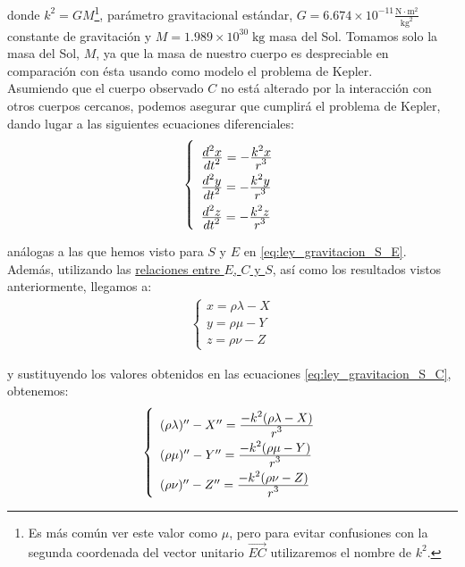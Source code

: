 \noindent donde $k^2=GM$\footnote{Es más común ver este valor como $\mu$, pero para evitar confusiones con la segunda coordenada del vector unitario $\overrightarrow{EC}$ utilizaremos el nombre de $k^2$.}, parámetro gravitacional estándar, $G=6.674\times10^{-11}\frac{\text{N}\cdot\text{m}^2}{\text{kg}^2}$ constante de gravitación y $M=1.989\times10^{30}\;\text{kg}$ masa del Sol. Tomamos solo la masa del Sol, $M$, ya que la masa de nuestro cuerpo es despreciable en comparación con ésta usando como modelo el problema de Kepler. \cite{mecanica_celeste}\\


\label{sec:ley_gravitacion}
Asumiendo que el cuerpo observado $C$ no está alterado por la interacción con otros cuerpos cercanos, podemos asegurar que cumplirá el problema de Kepler, dando lugar a las siguientes ecuaciones diferenciales:
\begin{align}
\left\{
\def\arraystretch{2}
\begin{array}{l}
	\ddfrac{d^2x}{dt^2}=-\ddfrac{k^2x}{r^3}\\
	\ddfrac{d^2y}{dt^2}=-\ddfrac{k^2y}{r^3}\\
	\ddfrac{d^2z}{dt^2}=-\ddfrac{k^2z}{r^3}
\end{array}
\right.
\label{eq:ley_gravitacion_S_C}
\end{align}

\noindent análogas a las que hemos visto para $S$ y $E$ en \eqref{eq:ley_gravitacion_S_E}.\\

Además, utilizando las \hyperref[eq:terminologia]{relaciones entre $E$, $C$ y $S$}, así como los resultados vistos anteriormente, llegamos a:
\begin{align}
\left\{
\begin{array}{l}
	x=\rho\lambda-X\\
	y=\rho\mu-Y\\
	z=\rho\nu-Z
\end{array}
\right.
\label{eq:relacion_C_S_E}
\end{align}

\noindent y sustituyendo los valores obtenidos en las  ecuaciones \eqref{eq:ley_gravitacion_S_C}, obtenemos:
\begin{align}
\left\{
\def\arraystretch{2}
\begin{array}{l}
	(\rho\lambda)'' - X'' = \ddfrac{-k^2(\rho\lambda-X)}{r^3}\\
	(\rho\mu)'' - Y'' = \ddfrac{-k^2(\rho\mu-Y)}{r^3}\\
	(\rho\nu)'' - Z'' = \ddfrac{-k^2(\rho\nu-Z)}{r^3}
\end{array}
\right.
\label{eq:derivada_segunda}
\end{align}

